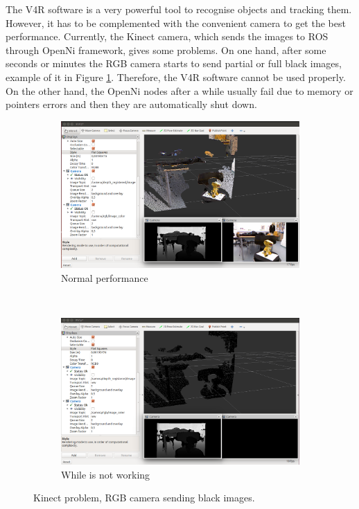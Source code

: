 \documentclass[12pt,a4paper,final,twoside,openright]{report}
\begin{document}
The V4R software is a very powerful tool to recognise objects and tracking them. However, it has to be complemented with the convenient camera to get the best performance. Currently, the Kinect camera, which sends the images to ROS through OpenNi framework, gives some problems. On one hand, after some seconds or minutes the RGB camera starts to send partial or full black images, example of it in Figure \ref{fig:kinect_black_problem}. Therefore, the V4R software cannot be used properly. On the other hand, the OpenNi nodes after a while usually fail due to memory or pointers errors and then they are automatically shut down.

\begin{figure}[h]
\begin{center}
\begin{subfigure}[r]{0.65\textwidth}
		\includegraphics[width=\textwidth]{images/kinect_problem_color}
        \caption{Normal performance}
\end{subfigure}
\\
\begin{subfigure}[r]{0.65\textwidth}
		\includegraphics[width=\textwidth]{images/kinect_problem_black}
        \caption{While is not working}
\end{subfigure}
\caption{Kinect problem, RGB camera sending black images.\label{fig:kinect_black_problem}}
\end{center}
\end{figure}
\end{document}
